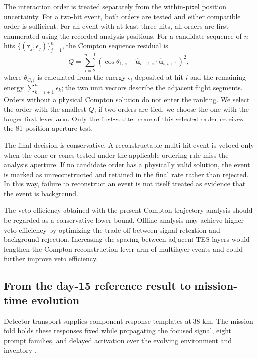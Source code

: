 \documentclass[11pt]{article}
\begin{document}
The interaction order is treated separately from the within-pixel position
uncertainty. For a two-hit event, both orders are tested and either compatible
order is sufficient. For an event with at least three hits, all orders are first
enumerated using the recorded analysis positions. For a candidate sequence of
$n$ hits $\{(\mathbf r_j,\epsilon_j)\}_{j=1}^{n}$, the Compton sequence residual
is
\begin{equation}
 Q=\sum_{i=2}^{n-1}\left(\cos\theta_{C,i}-
 \hat{\mathbf u}_{i-1,i}\!\cdot\!\hat{\mathbf u}_{i,i+1}\right)^2,
\end{equation}
where $\theta_{C,i}$ is calculated from the energy $\epsilon_i$ deposited at
hit $i$ and the remaining energy $\sum_{k=i+1}^{n}\epsilon_k$; the two unit
vectors describe the adjacent flight segments. Orders without a physical
Compton solution do not enter the ranking. We select the order with the smallest
$Q$; if two orders are tied, we choose the one with the longer first lever arm.
Only the first-scatter cone of this selected order receives the 81-position
aperture test.

The final decision is conservative. A reconstructable multi-hit event is vetoed
only when the cone or cones tested under the applicable ordering rule miss the
analysis aperture. If no candidate order has a physically valid solution, the
event is marked as unreconstructed and retained in the final rate rather than
rejected. In this way, failure to reconstruct an event is not itself treated as
evidence that the event is background.

The veto efficiency obtained with the present Compton-trajectory analysis should be regarded as a conservative lower bound. Offline analysis may achieve higher veto efficiency by optimizing the trade-off between signal retention and background rejection. Increasing the spacing between adjacent TES layers would lengthen the Compton-reconstruction lever arm of multilayer events and could further improve veto efficiency.

\subsection{From the day-15 reference result to mission-time evolution}
\label{sec:mission_time_fold}

Detector transport supplies component-response templates at 38 km. The mission
fold holds these responses fixed while propagating the focused signal, eight
prompt families, and delayed activation over the evolving environment and
inventory \cite{Gallego2025Balloon,Kierans2017}.
\end{document}
